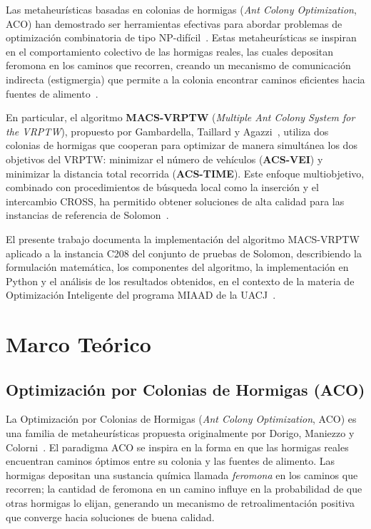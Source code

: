 \documentclass[12pt, letterpaper]{article}
\begin{document}
Las metaheurísticas basadas en colonias de hormigas (\textit{Ant Colony Optimization}, ACO) han demostrado ser herramientas efectivas para abordar problemas de optimización combinatoria de tipo NP-difícil~\cite{dorigo1996}. Estas metaheurísticas se inspiran en el comportamiento colectivo de las hormigas reales, las cuales depositan feromona en los caminos que recorren, creando un mecanismo de comunicación indirecta (estigmergia) que permite a la colonia encontrar caminos eficientes hacia fuentes de alimento~\cite{dorigo1997}.

En particular, el algoritmo \textbf{MACS-VRPTW} (\textit{Multiple Ant Colony System for the VRPTW}), propuesto por Gambardella, Taillard y Agazzi~\cite{gambardella1999}, utiliza dos colonias de hormigas que cooperan para optimizar de manera simultánea los dos objetivos del VRPTW: minimizar el número de vehículos (\textbf{ACS-VEI}) y minimizar la distancia total recorrida (\textbf{ACS-TIME}). Este enfoque multiobjetivo, combinado con procedimientos de búsqueda local como la inserción y el intercambio CROSS, ha permitido obtener soluciones de alta calidad para las instancias de referencia de Solomon~\cite{solomon1987}.

El presente trabajo documenta la implementación del algoritmo MACS-VRPTW aplicado a la instancia C208 del conjunto de pruebas de Solomon, describiendo la formulación matemática, los componentes del algoritmo, la implementación en Python y el análisis de los resultados obtenidos, en el contexto de la materia de Optimización Inteligente del programa MIAAD de la UACJ~\cite{porras2026material, porras2026actividad}.

\section{Marco Teórico}
\label{sec:marco_teorico}

\subsection{Optimización por Colonias de Hormigas (ACO)}
\label{subsec:aco}

La Optimización por Colonias de Hormigas (\textit{Ant Colony Optimization}, ACO) es una familia de metaheurísticas propuesta originalmente por Dorigo, Maniezzo y Colorni~\cite{dorigo1996}. El paradigma ACO se inspira en la forma en que las hormigas reales encuentran caminos óptimos entre su colonia y las fuentes de alimento. Las hormigas depositan una sustancia química llamada \textit{feromona} en los caminos que recorren; la cantidad de feromona en un camino influye en la probabilidad de que otras hormigas lo elijan, generando un mecanismo de retroalimentación positiva que converge hacia soluciones de buena calidad.
\end{document}
